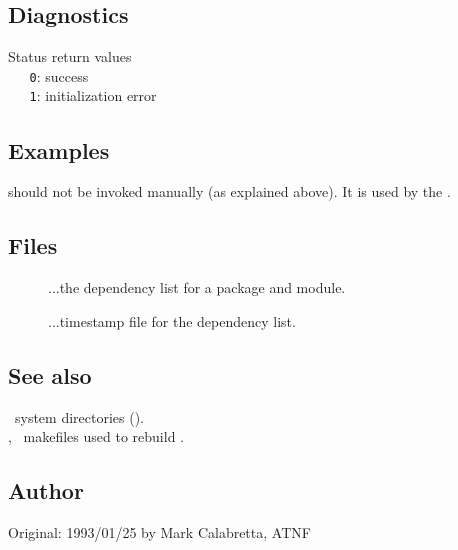 \subsection*{Diagnostics}

Status return values
\\ \verb+   0+: success
\\ \verb+   1+: initialization error

\subsection*{Examples}

 should not be invoked manually (as explained above).  It is used
by the  .

\subsection*{Files}

\begin{description}
\item[]
...the dependency list for a package and module.

\item[]
...timestamp file for the dependency list.
\end{description}

\subsection*{See also}

\aipspp\ system directories ().\\
, \gnu\ makefiles used to rebuild \aipspp.

\subsection*{Author}

Original: 1993/01/25 by Mark Calabretta, ATNF


\newpage
\section{}
\label{gmake}

